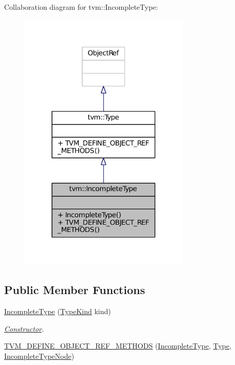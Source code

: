 Collaboration diagram for tvm\+:\+:Incomplete\+Type\+:
\nopagebreak
\begin{figure}[H]
\begin{center}
\leavevmode
\includegraphics[width=230pt]{classtvm_1_1IncompleteType__coll__graph}
\end{center}
\end{figure}
\subsection*{Public Member Functions}
\begin{DoxyCompactItemize}
\item 
\hyperlink{classtvm_1_1IncompleteType_aa37c3ced2e60a52b86ff2a0568feb430}{Incomplete\+Type} (\hyperlink{namespacetvm_acd267f8d7f55da6ac681239831963279}{Type\+Kind} kind)
\begin{DoxyCompactList}\small\item\em \hyperlink{classtvm_1_1Constructor}{Constructor}. \end{DoxyCompactList}\item 
\hyperlink{classtvm_1_1IncompleteType_a5956b02607eb9f4a61eeb3b250d41154}{T\+V\+M\+\_\+\+D\+E\+F\+I\+N\+E\+\_\+\+O\+B\+J\+E\+C\+T\+\_\+\+R\+E\+F\+\_\+\+M\+E\+T\+H\+O\+DS} (\hyperlink{classtvm_1_1IncompleteType}{Incomplete\+Type}, \hyperlink{classtvm_1_1Type}{Type}, \hyperlink{classtvm_1_1IncompleteTypeNode}{Incomplete\+Type\+Node})
\end{DoxyCompactItemize}



